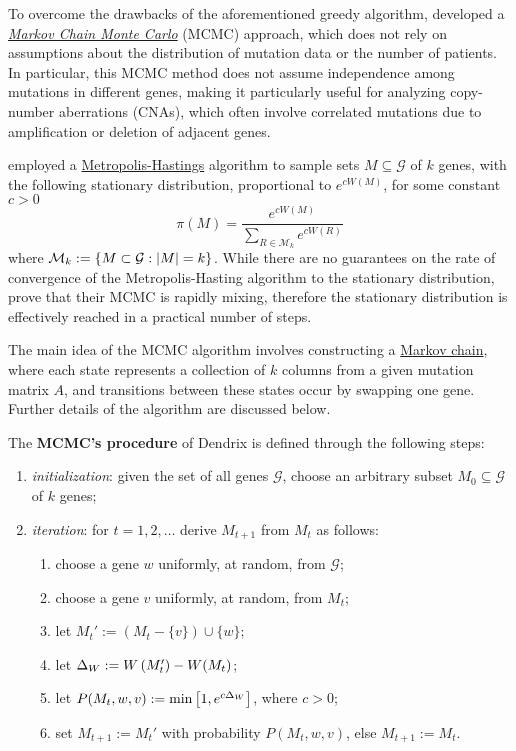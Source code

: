 To overcome the drawbacks of the aforementioned greedy algorithm, \textcite{dendrix} developed a \href{https://en.wikipedia.org/wiki/Markov_chain_Monte_Carlo}{\textit{Markov Chain Monte Carlo}} (MCMC) approach, which does not rely on assumptions about the distribution of mutation data or the number of patients. In particular, this MCMC method does not assume independence among mutations in different genes, making it particularly useful for analyzing copy-number aberrations (CNAs), which often involve correlated mutations due to amplification or deletion of adjacent genes.

\textcite{dendrix} employed a \href{https://en.wikipedia.org/wiki/Metropolis%E2%80%93Hastings_algorithm}{Metropolis-Hastings} algorithm to sample sets $M \subseteq \mathcal G$ of $k$ genes, with the following stationary distribution, proportional to $e^{cW(M)}$, for some constant $c > 0$ $$\pi(M) = \dfrac{e^{cW(M)}}{\sum_{R \in \mathcal M_k}{e^{cW(R)}}}$$ where $\mathcal M_k := \{M \subset \mathcal G : \left|M\right| = k\}$. While there are no guarantees on the rate of convergence of the Metropolis-Hasting algorithm to the stationary distribution, \textcite{dendrix} prove that their MCMC is rapidly mixing, therefore the stationary distribution is effectively reached in a practical number of steps.

The main idea of the MCMC algorithm involves constructing a \href{https://en.wikipedia.org/wiki/Markov_chain}{Markov chain}, where each state represents a collection of $k$ columns from a given mutation matrix $A$, and transitions between these states occur by swapping one gene. Further details of the algorithm are discussed below.

\begin{definition}
    The \textbf{MCMC's procedure} of Dendrix is defined through the following steps:

    \begin{enumerate}
        \item \textit{initialization}: given the set of all genes $\mathcal G$, choose an arbitrary subset $M_0 \subseteq \mathcal G$ of $k$ genes;
        \item \textit{iteration}: for $t = 1, 2, \ldots$ derive $M_{t + 1}$ from $M_t$ as follows:
            \begin{enumerate}
                \item choose a gene $w$ uniformly, at random, from $\mathcal G$;
                \item choose a gene $v$ uniformly, at random, from $M_t$;
                \item let $M_t' := (M_t - \{v\}) \cup \{w\}$;
                \item let $\Delta_W := W\left(M_t'\right) - W(M_t)$;
                \item let $P(M_t, w, v) := \min \left[1, e^{c \Delta_W}\right]$, where $c > 0$;
                \item set $M_{t+1} := M_t'$ with probability $P(M_t, w, v)$, else $M_{t + 1} := M_t$.
            \end{enumerate}
    \end{enumerate}
\end{definition}

